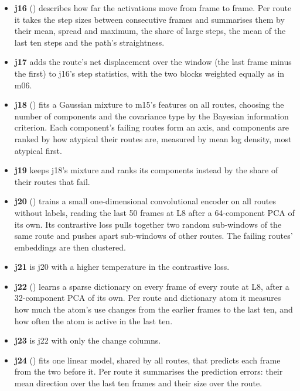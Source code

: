 \begin{itemize}
  \item \textbf{j16} () describes how far the activations
        move from frame to frame. Per route it takes the step sizes between
        consecutive frames and summarises them by their mean, spread and
        maximum, the share of large steps, the mean of the last ten steps and
        the path's straightness.
  \item \textbf{j17} adds the route's net displacement over the window (the last
        frame minus the first) to j16's step statistics, with the two blocks
        weighted equally as in m06.
  \item \textbf{j18} () fits a Gaussian mixture to m15's
        features on all routes, choosing the number of components and the
        covariance type by the Bayesian information criterion. Each component's
        failing routes form an axis, and components are ranked by how atypical
        their routes are, measured by mean log density, most atypical first.
  \item \textbf{j19} keeps j18's mixture and ranks its components instead by the
        share of their routes that fail.
  \item \textbf{j20} () trains a small one-dimensional
        convolutional encoder on all routes without labels, reading the last 50
        frames at L8 after a 64-component PCA of its own. Its contrastive
        loss pulls together two random sub-windows of the same route and pushes
        apart sub-windows of other routes. The failing routes' embeddings are
        then clustered.
  \item \textbf{j21} is j20 with a higher temperature in the contrastive loss.
  \item \textbf{j22} () learns a sparse dictionary on every
        frame of every route at L8, after a 32-component PCA of its own. Per route and dictionary atom it measures how much
        the atom's use changes from the earlier frames to the last ten, and how
        often the atom is active in the last ten.
  \item \textbf{j23} is j22 with only the change columns.
  \item \textbf{j24} () fits one linear model, shared by all
        routes, that predicts each frame from the two before it. Per route it
        summarises the prediction errors: their mean direction over the last ten
        frames and their size over the route.

\end{itemize}
